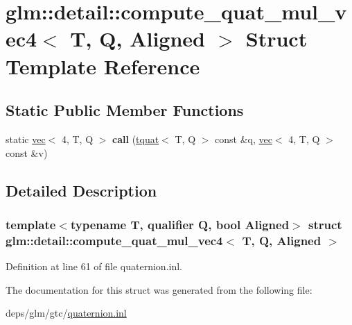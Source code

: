 \hypertarget{structglm_1_1detail_1_1compute__quat__mul__vec4}{}\section{glm\+:\+:detail\+:\+:compute\+\_\+quat\+\_\+mul\+\_\+vec4$<$ T, Q, Aligned $>$ Struct Template Reference}
\label{structglm_1_1detail_1_1compute__quat__mul__vec4}
\subsection*{Static Public Member Functions}
\begin{DoxyCompactItemize}
\item 
\mbox{\label{structglm_1_1detail_1_1compute__quat__mul__vec4_a5482b25b24a73e5a7a522f771e0045b0}} 
static \hyperlink{structglm_1_1vec}{vec}$<$ 4, T, Q $>$ {\bfseries call} (\hyperlink{structglm_1_1tquat}{tquat}$<$ T, Q $>$ const \&q, \hyperlink{structglm_1_1vec}{vec}$<$ 4, T, Q $>$ const \&v)
\end{DoxyCompactItemize}


\subsection{Detailed Description}
\subsubsection*{template$<$typename T, qualifier Q, bool Aligned$>$\newline
struct glm\+::detail\+::compute\+\_\+quat\+\_\+mul\+\_\+vec4$<$ T, Q, Aligned $>$}



Definition at line 61 of file quaternion.\+inl.



The documentation for this struct was generated from the following file\+:\begin{DoxyCompactItemize}
\item 
deps/glm/gtc/\hyperlink{gtc_2quaternion_8inl}{quaternion.\+inl}\end{DoxyCompactItemize}
